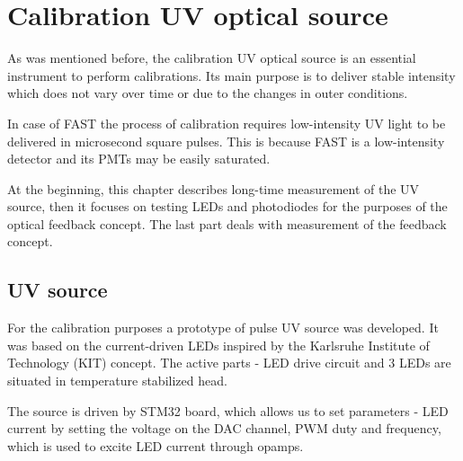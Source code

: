 
\chapter{Calibration UV optical source}
 \label{chap4}
As was mentioned before, the calibration UV optical source is an essential instrument to perform calibrations. Its main purpose is to deliver stable intensity which does not vary over time or due to the changes in outer conditions.
\par
In case of FAST the process of calibration requires low-intensity UV light to be delivered in microsecond square pulses. This is because FAST is a low-intensity detector and its PMTs may be easily saturated.
\par
At the beginning, this chapter describes long-time measurement of the UV source, then it focuses on testing LEDs and photodiodes for the purposes of the optical feedback concept. The last part deals with measurement of the feedback concept. 


\section{UV source}
For the calibration purposes a prototype of pulse UV source was developed. It was based on the current-driven LEDs inspired by the Karlsruhe Institute of Technology (KIT) concept. The active parts - LED drive circuit and 3 LEDs are situated in temperature stabilized head. 
\par
The source is driven by STM32 board, which allows us to set parameters - LED current by setting the voltage on the DAC channel, PWM duty and frequency, which is used to excite LED current through opamps.
 


